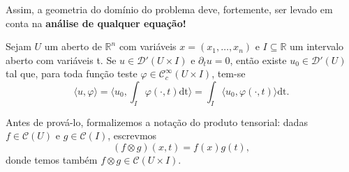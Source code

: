 \documentclass[../distribution_theory_notes.tex]{subfiles}
\begin{document}
     Assim, a geometria do domínio do problema deve, fortemente, ser levado em conta na \textbf{análise de qualquer equação!}
    \begin{theorem*}
      Sejam \(U\) um aberto de \(\mathbb{R}^{n}\) com variáveis \(x=(x_1,\dotsc , x_{n})\) e \(I\subseteq \mathbb{R}\) um intervalo aberto com variáveis t. Se \(u\in \mathcal{D}'(U\times I)\) e \(\partial_t u=0\), então existe \(u_{0}\in \mathcal{D}'(U)\) tal que, para toda função teste \(\varphi \in \mathcal{C}_{c}^{\infty}(U\times I)\), tem-se 
        \[
          \langle u, \varphi  \rangle = \biggl\langle u_{0}, \int_{I}^{}\varphi (\cdot , t) \mathrm{dt} \biggr\rangle = \int_{I}^{}\langle u_{0}, \varphi (\cdot , t) \rangle \mathrm{dt}.
        \]
    \end{theorem*}
    Antes de prová-lo, formalizemos a notação do produto tensorial: dadas \(f\in \mathcal{C}(U)\) e \(g\in \mathcal{C}(I)\), escrevmos 
      \[
        (f\otimes g)(x, t)=f(x)g(t),
      \]
      donde temos também \(f\otimes g\in \mathcal{C}(U\times I)\).
\end{document}
